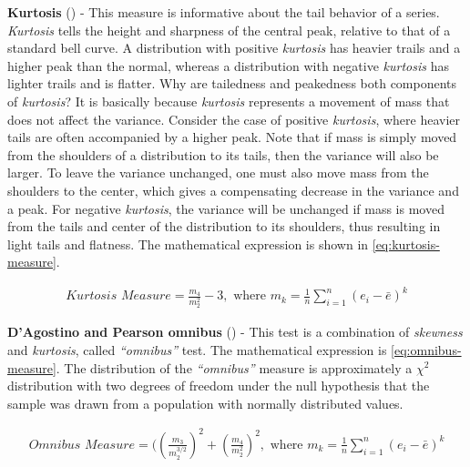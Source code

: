 \textbf{Kurtosis} (\cite{anscombe1983distribution}) - This measure is
informative about the tail behavior of a series. \textit{Kurtosis}
tells the height and sharpness of the central peak, relative to that
of a standard bell curve. A distribution with positive
\textit{kurtosis} has heavier trails and a higher peak than the
normal, whereas a distribution with negative \textit{kurtosis} has
lighter trails and is flatter. Why are tailedness and peakedness both
components of \textit{kurtosis}? It is basically because
\textit{kurtosis} represents a movement of mass that does not affect
the variance. Consider the case of positive \textit{kurtosis}, where
heavier tails are often accompanied by a higher peak. Note that if
mass is simply moved from the shoulders of a distribution to its
tails, then the variance will also be larger. To leave the variance
unchanged, one must also move mass from the shoulders to the center,
which gives a compensating decrease in the variance and a peak. For
negative \textit{kurtosis}, the variance will be unchanged if mass is
moved from the tails and center of the distribution to its shoulders,
thus resulting in light tails and flatness. The mathematical
expression is shown in \autoref{eq:kurtosis-measure}.

\begin{equation}
  \begin{aligned}
    \label{eq:kurtosis-measure}
    \textit{Kurtosis Measure} = \frac{m_4}{m_2^2} - 3, \text{ where }
    m_k = \frac{1}{n} \displaystyle\sum_{i=1}^n (e_i - \bar{e})^k
  \end{aligned}
\end{equation}

\textbf{D’Agostino and Pearson omnibus} (\cite{d1971omnibus,
d1973tests}) - This test is a combination of \textit{skewness} and
\textit{kurtosis}, called \textit{``omnibus''} test. The mathematical
expression is \autoref{eq:omnibus-measure}. The distribution of the
\textit{``omnibus''} measure is approximately a $\chi^2$ distribution
with two degrees of freedom under the null hypothesis that the sample
was drawn from a population with normally distributed values.

\begin{equation}
  \begin{aligned}
    \label{eq:omnibus-measure}
    \textit{Omnibus Measure} =
    ((\frac{m_3}{m_2^{3/2}})^2 + (\frac{m_4}{m_2^2})^2, \text{ where }
    m_k = \frac{1}{n} \displaystyle\sum_{i=1}^n (e_i - \bar{e} )^k
  \end{aligned}
\end{equation}

